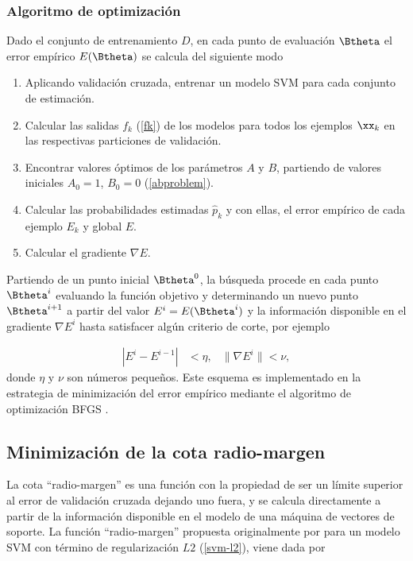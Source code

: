 \subsubsection{Algoritmo de optimización}
Dado el conjunto de entrenamiento $D$, en cada punto de evaluación
$\Btheta$ el error empírico $E(\Btheta)$ se calcula del siguiente modo

\begin{enumerate}
\item Aplicando validación cruzada, entrenar un modelo SVM para cada
  conjunto de estimación.
\item Calcular las salidas $f_k$ (\autoref{fk}) de los
  modelos para todos los ejemplos $\xx_k$ en las respectivas
  particiones de validación.
\item Encontrar valores óptimos de los parámetros $A$ y $B$, partiendo
  de valores iniciales $A_0=1$, $B_0=0$ (\autoref{abproblem}).
\item Calcular las probabilidades estimadas $\hat{p}_k$ y con ellas,
  el error empírico de cada ejemplo $E_k$ y global $E$.
\item Calcular el gradiente $\nabla{}E$.
\end{enumerate}
Partiendo de un punto inicial $\Btheta^0$, la búsqueda procede en cada
punto $\Btheta^i$ evaluando la función objetivo y determinando un
nuevo punto $\Btheta^{i+1}$ a partir del valor $E^i=E(\Btheta^i)$ y la
información disponible en el gradiente $\nabla{}E^i$ hasta satisfacer
algún criterio de corte, por ejemplo

\begin{align*}
  |E^i-E^{i-1}|&<\eta, & \|\nabla E^i\| < \nu,
\end{align*}
donde $\eta$ y $\nu$ son números pequeños.  Este esquema es
implementado en la estrategia de minimización del error empírico
mediante el algoritmo de optimización BFGS \cite{bfgs}.

\subsection{Minimización de la cota radio-margen}
La cota ``radio-margen'' es una función con la propiedad de ser un
límite superior al error de validación cruzada dejando uno fuera, y se
calcula directamente a partir de la información disponible en el
modelo de una máquina de vectores de soporte.  La función
``radio-margen'' propuesta originalmente por \citeauthor{vapnik}
\cite{vapnik} para un modelo SVM  con término de regularización $L2$
(\autoref{svm-l2}), viene dada por %

